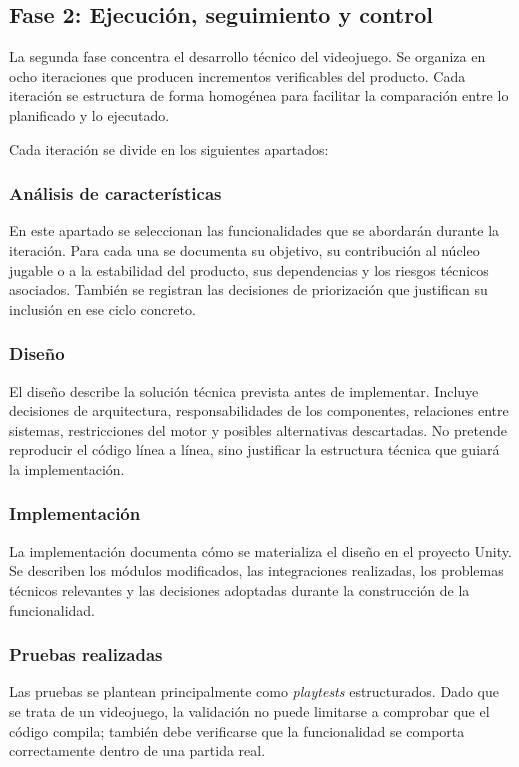 \subsection{Fase 2: Ejecución, seguimiento y control}
La segunda fase concentra el desarrollo técnico del videojuego. Se organiza en ocho
iteraciones que producen incrementos verificables del producto. Cada iteración se estructura
de forma homogénea para facilitar la comparación entre lo planificado y lo ejecutado.

Cada iteración se divide en los siguientes apartados:

\subsubsection{Análisis de características}
En este apartado se seleccionan las funcionalidades que se abordarán durante la iteración.
Para cada una se documenta su objetivo, su contribución al núcleo jugable o a la estabilidad
del producto, sus dependencias y los riesgos técnicos asociados. También se registran las
decisiones de priorización que justifican su inclusión en ese ciclo concreto.

\subsubsection{Diseño}
El diseño describe la solución técnica prevista antes de implementar. Incluye decisiones de
arquitectura, responsabilidades de los componentes, relaciones entre sistemas, restricciones
del motor y posibles alternativas descartadas. No pretende reproducir el código línea a
línea, sino justificar la estructura técnica que guiará la implementación.

\subsubsection{Implementación}
La implementación documenta cómo se materializa el diseño en el proyecto Unity. Se describen
los módulos modificados, las integraciones realizadas, los problemas técnicos relevantes y
las decisiones adoptadas durante la construcción de la funcionalidad.

\subsubsection{Pruebas realizadas}
Las pruebas se plantean principalmente como \textit{playtests} estructurados. Dado que se
trata de un videojuego, la validación no puede limitarse a comprobar que el código compila;
también debe verificarse que la funcionalidad se comporta correctamente dentro de una
partida real.

